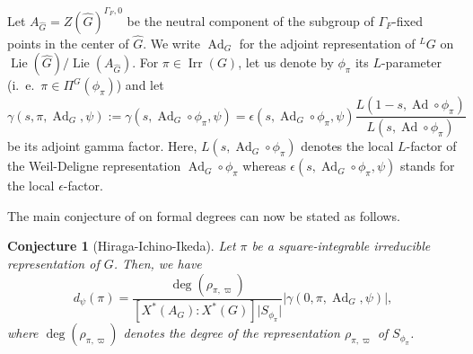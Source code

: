 \documentclass[12pt]{article}
\newtheorem{conj}{Conjecture}[section]
\numberwithin{equation}{section}
\DeclareMathOperator{\Ad}{Ad}
\DeclareMathOperator{\Lie}{Lie}
\DeclareMathOperator{\Irr}{Irr}
\begin{document}
Let $A_{\widehat{G}}=Z(\widehat{G})^{\Gamma_F,0}$ be the neutral component of the subgroup of $\Gamma_F$-fixed points in the center of $\widehat{G}$. We write $\Ad_G$ for  the adjoint representation of ${}^L G$ on $\Lie(\widehat{G})/\Lie(A_{\widehat{G}})$. For $\pi\in \Irr(G)$, let us denote by $\phi_\pi$ its $L$-parameter (i.\ e.\ $\pi\in \Pi^G(\phi_\pi)$) and let
$$\displaystyle \gamma(s,\pi,\Ad_G,\psi):= \gamma(s,\Ad_G\circ \phi_\pi,\psi)=\epsilon(s,\Ad_G\circ \phi_\pi,\psi)\frac{L(1-s,\Ad\circ \phi_\pi)}{L(s,\Ad\circ \phi_\pi)}$$
be its adjoint gamma factor. Here, $L(s,\Ad_G\circ \phi_\pi)$ denotes the local $L$-factor of the Weil-Deligne representation $\Ad_G\circ \phi_\pi$ whereas $\epsilon(s,\Ad_G\circ \phi_\pi,\psi)$ stands for the local $\epsilon$-factor.

The main conjecture of \cite{HII} on formal degrees can now be stated as follows.

\begin{conj}[Hiraga-Ichino-Ikeda]\label{Conj HII}
Let $\pi$ be a square-integrable irreducible representation of $G$. Then, we have
\begin{equation*}
\displaystyle d_\psi(\pi)=\frac{\deg(\rho_{\pi,\varpi})}{[X^*(A_G):X^*(G)]\lvert S_{\phi_\pi}\rvert} \lvert \gamma(0,\pi,\Ad_G,\psi)\rvert,
\end{equation*}
where $\deg(\rho_{\pi,\varpi})$ denotes the degree of the representation $\rho_{\pi,\varpi}$ of $S_{\phi_\pi}$.
\end{conj}
\end{document}
